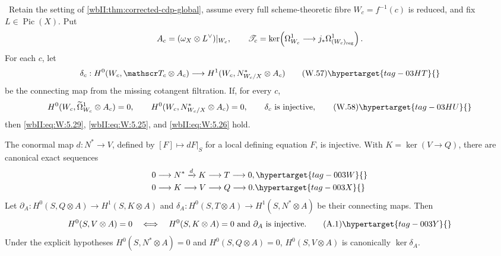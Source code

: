 
\begin{theorem}
\hypertarget{tag-03IZ}{}\label{wbII:thm:corrected-cdp-fibrewise}


\ Retain the setting of
\cref{wbII:thm:corrected-cdp-global}, assume every full scheme-theoretic fibre
\(W_c=f^{-1}(c)\) is reduced, and fix \(L\in\operatorname{Pic}(X)\).  Put
\[
 A_c=(\omega_X\otimes L^\vee)|_{W_c},\qquad
 \mathscr T_c=\ker\!\left(
 \Omega^1_{W_c}\longrightarrow
 j_*\Omega^1_{(W_c)_{\rm reg}}\right).
\]
For each \(c\), let
\[
 \delta_c:
 H^0(W_c,\mathscr T_c\otimes A_c)
 \longrightarrow
 H^1(W_c,N^*_{W_c/X}\otimes A_c)
\tag{W.57}\hypertarget{tag-03HT}{}\label{wbII:eq:W:5.30}
\]
be the connecting map from the missing cotangent filtration.  If, for every
\(c\),
\[
 H^0(W_c,\widetilde\Omega^1_{W_c}\otimes A_c)=0,\qquad
 H^0(W_c,N^*_{W_c/X}\otimes A_c)=0,\qquad
 \delta_c\ \text{is injective},
\tag{W.58}\hypertarget{tag-03HU}{}\label{wbII:eq:W:5.31}
\]
then \eqref{wbII:eq:W:5.29}, \eqref{wbII:eq:W:5.25}, and \eqref{wbII:eq:W:5.26} hold.
\end{theorem}

\begin{proposition}\hypertarget{tag-01AD}{}\label{cdp:st:A.1.1}

\label{wbII:prop:criterion}\label{wbII:prop:filtration}\label{wbII:lem:conormal}\label{wbII:lem:conormal-injective}\label{wbII:prop:missing-global-section-criterion}\label{wbII:prop:missing-cotangent-filtration}
The conormal map $d:N^*\to V$, defined by $[F]\mapsto dF|_S$ for a local defining equation $F$, is injective. With $K=\ker(V\to Q)$, there are canonical exact sequences
\begin{align}
0&\longrightarrow N^*\xrightarrow{d}K\longrightarrow T\longrightarrow0,
\hypertarget{tag-003W}{}\label{cdp:A:filtration1}\\
0&\longrightarrow K\longrightarrow V\longrightarrow Q\longrightarrow0.
\hypertarget{tag-003X}{}\label{cdp:A:filtration2}
\end{align}
Let $\partial_A:H^0(S,Q\otimes A)\to H^1(S,K\otimes A)$ and $\delta_A:H^0(S,T\otimes A)\to H^1(S,N^*\otimes A)$ be their connecting maps. Then
\[
 H^0(S,V\otimes A)=0
 \quad\Longleftrightarrow\quad
 H^0(S,K\otimes A)=0\ \hbox{and}\ \partial_A\hbox{ is injective}.
\tag{A.1}\hypertarget{tag-003Y}{}\label{cdp:eq:A.1}
\]
Under the explicit hypotheses $H^0(S,N^*\otimes A)=0$ and $H^0(S,Q\otimes A)=0$, $H^0(S,V\otimes A)$ is canonically $\ker\delta_A$.
\end{proposition}

